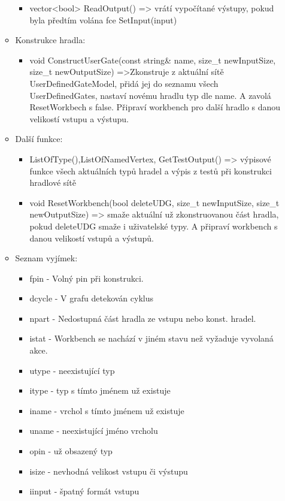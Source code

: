 \documentclass[12pt, oneside]{article}
\begin{document}
\begin{itemize}
\begin{itemize}
\begin{itemize}
\item vector<bool> ReadOutput() => vrátí vypočítané výstupy, pokud byla předtím volána fce SetInput(input) 
\end{itemize}
\item Konstrukce hradla: 
\begin{itemize} 
\item void ConstructUserGate(const string\& name, size\_t newInputSize, size\_t newOutputSize) =>Zkonstruje z aktuální sítě UserDefinedGateModel, přidá jej do seznamu všech UserDefinedGates, nastaví novému hradlu typ dle name. A  zavolá ResetWorkbech s false. Připraví workbench pro další hradlo s danou velikostí vstupu a výstupu.
\end{itemize} 
\item Další funkce: 
\begin{itemize}
\item  ListOfType(),ListOfNamedVertex, GetTestOutput() => výpisové funkce všech aktuálních typů hradel a výpis z testů při konstrukci hradlové sítě
\item void ResetWorkbench(bool deleteUDG, size\_t newInputSize, size\_t newOutputSize) => smaže aktuální už zkonstruovanou část hradla, pokud deleteUDG smaže i uživatelské typy. A připraví workbench s danou velikostí vstupů a výstupů.
\end{itemize} 
\item Seznam vyjímek: 
\begin{itemize}
\item fpin -  Volný pin při konstrukci. 
\item dcycle - V grafu detekován cyklus 
\item npart - Nedostupná část hradla ze vstupu nebo konst. hradel.
\item istat - Workbench se nachází v jiném stavu než vyžaduje vyvolaná akce. 
\item utype - neexistující typ
\item itype - typ s tímto jménem už existuje
\item iname - vrchol  s tímto jménem už existuje 
\item uname - neexistující jméno vrcholu
\item opin - už obsazený typ 
\item isize - nevhodná velikost vstupu či výstupu
\item iinput - špatný formát vstupu
\end{itemize} 

\end{itemize} 
\end{itemize} 
\end{document}
